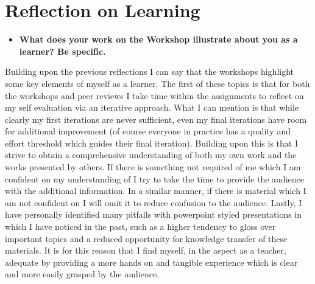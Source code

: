 \documentclass[12pt]{article}
\begin{document}
\section{Reflection on Learning}
\begin{itemize}
    \item \textbf{What does your work on the Workshop illustrate about you as a learner? Be specific.}
\end{itemize}

Building upon the previous reflections I can say that the workshops highlight some key elements of myself as a learner. The first of these topics is that for both the workshops and peer reviews I take time within the assignments to reflect on my self evaluation via an iterative approach. What I can mention is that while clearly my first iterations are never sufficient, even my final iterations have room for additional improvement (of course everyone in practice has a quality and effort threshold which guides their final iteration). Building upon this is that I strive to obtain a comprehensive understanding of both my own work and the works presented by others. If there is something not required of me which I am confident on my understanding of I try to take the time to provide the audience with the additional information. In a similar manner, if there is material which I am not confident on I will omit it to reduce confusion to the audience. Lastly, I have personally identified many pitfalls with powerpoint styled presentations in which I have noticed in the past, such as a higher tendency to gloss over important topics and a reduced opportunity for knowledge transfer of these materials. It is for this reason that I find myself, in the aspect as a teacher, adequate by providing a more hands on and tangible experience which is clear and more easily grasped by the audience.
\end{document}
